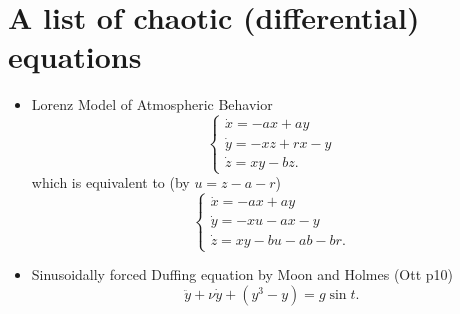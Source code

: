 \documentclass[11pt]{book}
\begin{document}
\section{A list of chaotic (differential) equations}
\begin{itemize}
  \item Lorenz Model of Atmospheric Behavior
    \begin{equation*}
     \begin{cases}
      \dot{x} = -ax + ay \\
      \dot{y} = -xz + rx -y \\
      \dot{z} = xy - bz.
    \end{cases}
    \end{equation*}
    which is equivalent to (by $u = z - a - r$)
    \begin{equation*}
     \begin{cases}
      \dot{x} = -ax + ay \\
      \dot{y} = -xu - ax -y \\
      \dot{z} = xy - bu -ab -br.
    \end{cases}
    \end{equation*}

  \item Sinusoidally forced Duffing equation by Moon and Holmes (Ott p10)
    \begin{equation*}
      \ddot{y} + \nu \dot{y} + (y^3 - y) = g\sin t.
    \end{equation*}
    \end{itemize}



\end{document}
